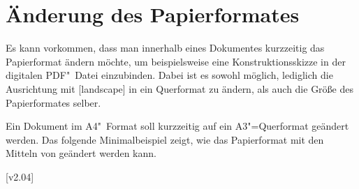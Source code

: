\section{Änderung des Papierformates}
Es kann vorkommen, dass man innerhalb eines Dokumentes kurzzeitig das 
Papierformat ändern möchte, um beispielsweise eine Konstruktionsskizze in der 
digitalen PDF"~Datei einzubinden. Dabei ist es sowohl möglich, lediglich die 
Ausrichtung mit [landscape] in ein Querformat zu ändern, als 
auch die Größe des Papierformates selber.
%
\begin{Example}
Ein Dokument im A4"~Format soll kurzzeitig auf ein A3"=Querformat geändert 
werden. Das folgende Minimalbeispiel zeigt, wie das Papierformat mit den 
Mitteln von \KOMAScript{} geändert werden kann.
\end{Example}

[v2.04]



